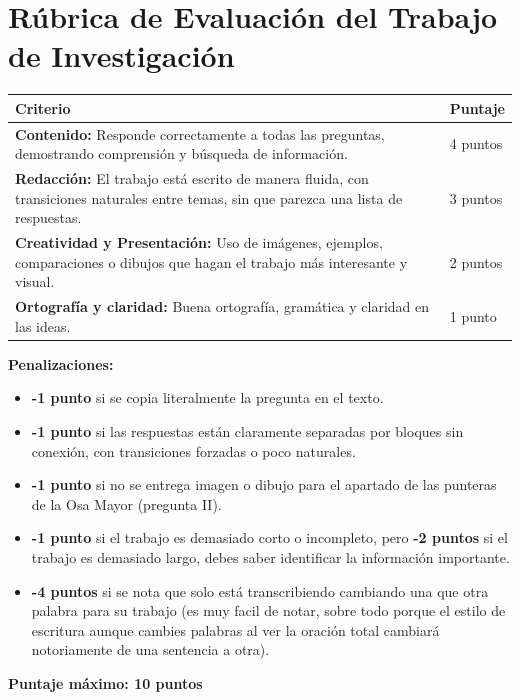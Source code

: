 \documentclass{article}
\theoremstyle{nonumberplain}
\begin{document}
\section*{Rúbrica de Evaluación del Trabajo de Investigación}

\begin{tabular}{|p{9cm}|p{3cm}|}
\hline
\textbf{Criterio} & \textbf{Puntaje} \\
\hline
\textbf{Contenido:} Responde correctamente a todas las preguntas, demostrando comprensión y búsqueda de información. & 4 puntos \\
\hline
\textbf{Redacción:} El trabajo está escrito de manera fluida, con transiciones naturales entre temas, sin que parezca una lista de respuestas. & 3 puntos \\
\hline
\textbf{Creatividad y Presentación:} Uso de imágenes, ejemplos, comparaciones o dibujos que hagan el trabajo más interesante y visual. & 2 puntos \\
\hline
\textbf{Ortografía y claridad:} Buena ortografía, gramática y claridad en las ideas. & 1 punto \\
\hline
\end{tabular}

\vspace{0.5cm}
\newpage
\textbf{Penalizaciones:}

\begin{itemize}
    \item \textbf{-1 punto} si se copia literalmente la pregunta en el texto.
    \item \textbf{-1 punto} si las respuestas están claramente separadas por bloques sin conexión, con transiciones forzadas o poco naturales.
    \item \textbf{-1 punto} si no se entrega imagen o dibujo para el apartado de las punteras de la Osa Mayor (pregunta II).
    \item \textbf{-1 punto} si el trabajo es demasiado corto o incompleto, pero \textbf{-2 puntos} si el trabajo es demasiado largo, debes saber identificar la información importante.
    \item \textbf{-4 puntos} si se nota que solo está transcribiendo cambiando una que otra palabra para su trabajo (es muy facil de notar, sobre todo porque el estilo de escritura aunque cambies palabras al ver la oración total cambiará notoriamente de una sentencia a otra).
\end{itemize}

\vspace{0.5cm}

\textbf{Puntaje máximo: 10 puntos}
\end{document}
